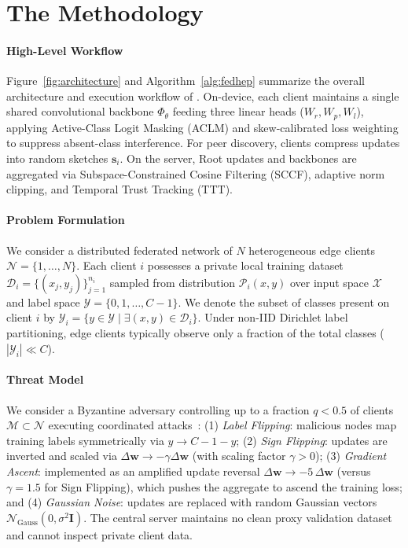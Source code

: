 \section{The \fedhep{} Methodology}
\label{sec:method}
\label{sec:overview}

\paragraph{High-Level Workflow}
Figure~\ref{fig:architecture} and Algorithm~\ref{alg:fedhep} summarize the overall architecture and execution workflow of \fedhep{}. On-device, each client maintains a single shared convolutional backbone $\Phi_\theta$ feeding three linear heads ($W_r, W_p, W_l$), applying Active-Class Logit Masking (ACLM) and skew-calibrated loss weighting to suppress absent-class interference. For peer discovery, clients compress updates into random sketches $\mathbf{s}_i$. On the server, Root updates and backbones are aggregated via Subspace-Constrained Cosine Filtering (SCCF), adaptive norm clipping, and Temporal Trust Tracking (TTT).


\paragraph{Problem Formulation}
We consider a distributed federated network of $N$ heterogeneous edge clients $\mathcal{N} = \{1, \dots, N\}$. Each client $i$ possesses a private local training dataset $\mathcal{D}_i = \{(x_j, y_j)\}_{j=1}^{n_i}$ sampled from distribution $\mathcal{P}_i(x, y)$ over input space $\mathcal{X}$ and label space $\mathcal{Y} = \{0, 1, \dots, C-1\}$. We denote the subset of classes present on client $i$ by $\mathcal{Y}_i = \{y \in \mathcal{Y} \mid \exists (x, y) \in \mathcal{D}_i\}$. Under non-IID Dirichlet label partitioning, edge clients typically observe only a fraction of the total classes ($|\mathcal{Y}_i| \ll C$).

\paragraph{Threat Model}
We consider a Byzantine adversary controlling up to a fraction $q < 0.5$ of clients $\mathcal{M} \subset \mathcal{N}$ executing coordinated attacks~\cite{fang2020local,bhagoji2019analyzing,shejwalkar2021manipulating}:
(1) \textit{Label Flipping}: malicious nodes map training labels symmetrically via $y \to C - 1 - y$;
(2) \textit{Sign Flipping}: updates are inverted and scaled via $\Delta \mathbf{w} \to -\gamma \Delta \mathbf{w}$ (with scaling factor $\gamma > 0$);
(3) \textit{Gradient Ascent}: implemented as an amplified update reversal $\Delta \mathbf{w} \to -5\,\Delta \mathbf{w}$ (versus $\gamma=1.5$ for Sign Flipping), which pushes the aggregate to ascend the training loss; and
(4) \textit{Gaussian Noise}: updates are replaced with random Gaussian vectors $\mathcal{N}_{\mathrm{Gauss}}(0, \sigma^2 \mathbf{I})$.
The central server maintains no clean proxy validation dataset and cannot inspect private client data.

